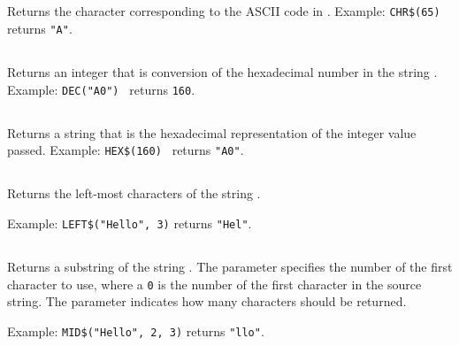 \documentclass{article}
\begin{document}
    \subsection{}

    Returns the character corresponding to the ASCII code in .
    Example: \verb+CHR$(65)+ returns \verb+"A"+.   

    \subsection{}

    Returns an integer that is conversion of the hexadecimal number in the string .
    Example: \verb+DEC("A0") + returns \verb+160+.

    \subsection{}

    Returns a string that is the hexadecimal representation of the integer value passed.
    Example: \verb+HEX$(160) + returns \verb+"A0"+.

    \subsection{}

    Returns the left-most  characters of the string .

    Example: \verb+LEFT$("Hello", 3)+ returns \verb+"Hel"+.   

    \subsection{}

    Returns a substring of the string .
    The parameter  specifies the number of the first character to use, where
    a \verb+0+ is the number of the first character in the source string.
    The parameter  indicates how many characters should be returned.

    Example: \verb+MID$("Hello", 2, 3)+ returns \verb+"llo"+.

    \subsection{}
\end{document}
